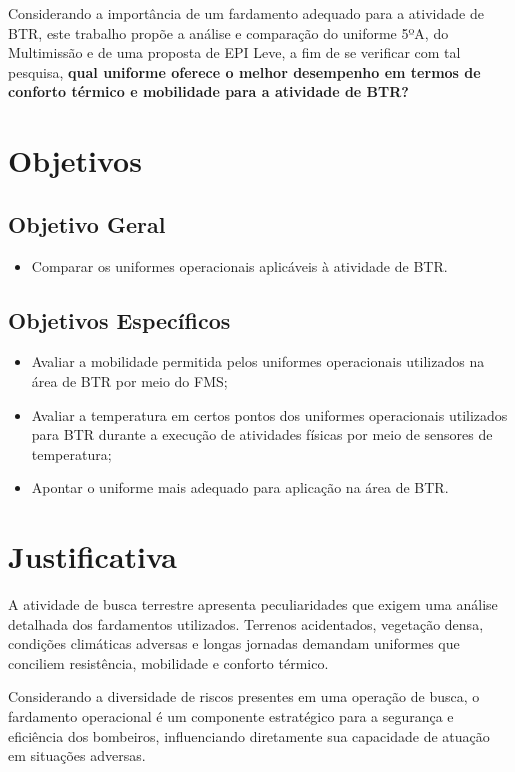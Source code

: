 		Considerando a importância de um fardamento adequado para a atividade de \acrshort{BTR}, este trabalho propõe a análise e comparação do
	 	uniforme 5ºA, do Multimissão e de uma proposta de \acrshort{EPI} Leve, a fim de se verificar com tal pesquisa, \textbf{qual uniforme oferece o melhor desempenho 
	 	em termos de conforto térmico e mobilidade para a atividade de \acrlong{BTR}?}

	\section{Objetivos}

		\subsection{Objetivo Geral}
			\begin{itemize}
				\item Comparar os uniformes operacionais aplicáveis à atividade de \acrlong{BTR}.
			\end{itemize}
		\subsection{Objetivos Específicos}
			\begin{itemize}
				\item Avaliar a mobilidade permitida pelos uniformes operacionais utilizados na área de \acrlong{BTR} por meio do \acrfull{FMS};
				\item Avaliar a temperatura em certos pontos dos uniformes operacionais utilizados para \acrlong{BTR} durante a execução de atividades físicas por meio de sensores de temperatura;
				\item Apontar o uniforme mais adequado para aplicação na área de \acrlong{BTR}.
			\end{itemize}
\section{Justificativa}
	
	A atividade de busca terrestre apresenta peculiaridades que exigem uma análise detalhada dos 
	fardamentos utilizados. Terrenos acidentados, vegetação densa, condições climáticas adversas 
	e longas jornadas demandam uniformes que conciliem resistência, mobilidade e conforto térmico.
	
	Considerando a diversidade de riscos presentes em uma operação de busca, o fardamento operacional é um componente estratégico para
	 a segurança e eficiência dos bombeiros, influenciando diretamente sua capacidade de atuação em situações adversas.
	
